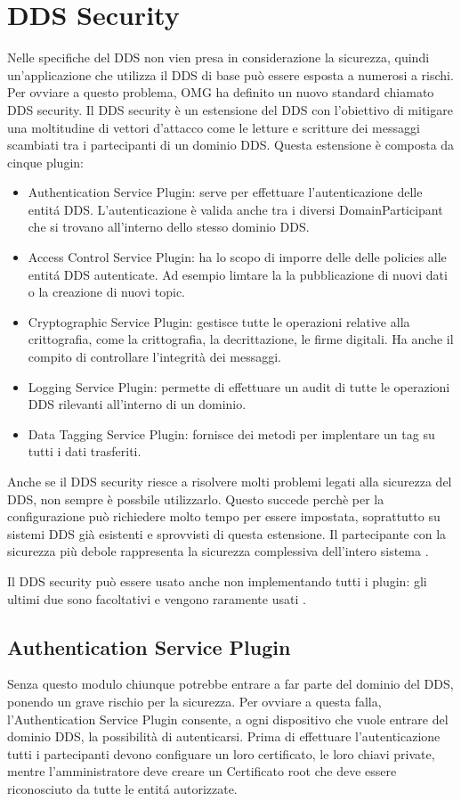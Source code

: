 \section{DDS Security}
Nelle specifiche del DDS non vien presa in considerazione la sicurezza, quindi
un'applicazione che utilizza il DDS di base può essere esposta a numerosi a 
rischi. Per ovviare a questo problema, OMG ha definito un nuovo standard 
chiamato DDS security. Il DDS security è un estensione del DDS con 
l'obiettivo di mitigare una moltitudine di vettori d'attacco come 
le letture e scritture dei messaggi scambiati tra i partecipanti di un 
dominio DDS. Questa estensione è composta da cinque plugin:
\begin{itemize}
    \item Authentication Service Plugin: serve per effettuare l'autenticazione 
    delle entitá DDS. L'autenticazione è valida anche tra i diversi 
    DomainParticipant che si trovano all'interno dello stesso dominio DDS.
    \item Access Control Service Plugin: ha lo scopo di imporre delle 
    delle policies alle entitá DDS autenticate. Ad esempio limtare la
    la pubblicazione di nuovi dati o la creazione di nuovi topic.
    \item Cryptographic Service Plugin: gestisce tutte le operazioni 
    relative alla crittografia, come la crittografia, la decrittazione,
    le firme digitali. Ha anche il compito di controllare l'integrità
    dei messaggi.
    \item Logging Service Plugin: permette di effettuare un audit di 
    tutte le operazioni DDS rilevanti all'interno di un dominio.
    \item Data Tagging Service Plugin: fornisce dei metodi per implentare
    un tag su tutti i dati trasferiti. 
\end{itemize}
Anche se il DDS security riesce a risolvere molti problemi legati alla
sicurezza del DDS, non sempre è possbile utilizzarlo. Questo succede 
perchè per la configurazione può richiedere molto tempo per essere 
impostata, soprattutto su sistemi DDS già esistenti e sprovvisti di 
questa estensione.
Il partecipante con la sicurezza più debole rappresenta la sicurezza
complessiva dell'intero sistema \cite{Michaud2017Apr}. 

Il DDS security può essere usato anche non implementando tutti i plugin:
gli ultimi due sono facoltativi e vengono raramente usati \cite{essay93639}. 


\subsection{Authentication Service Plugin}
Senza questo modulo chiunque potrebbe entrare a far parte del dominio
del DDS, ponendo un grave rischio per la sicurezza. Per ovviare a questa
falla, l'Authentication Service Plugin consente, a ogni dispositivo che 
vuole entrare del dominio DDS, la possibilità di autenticarsi.
Prima di effettuare l'autenticazione tutti i partecipanti devono 
configuare un loro certificato, le loro chiavi private, mentre 
l'amministratore deve creare un Certificato root che deve 
essere riconosciuto da tutte le entitá autorizzate. 

